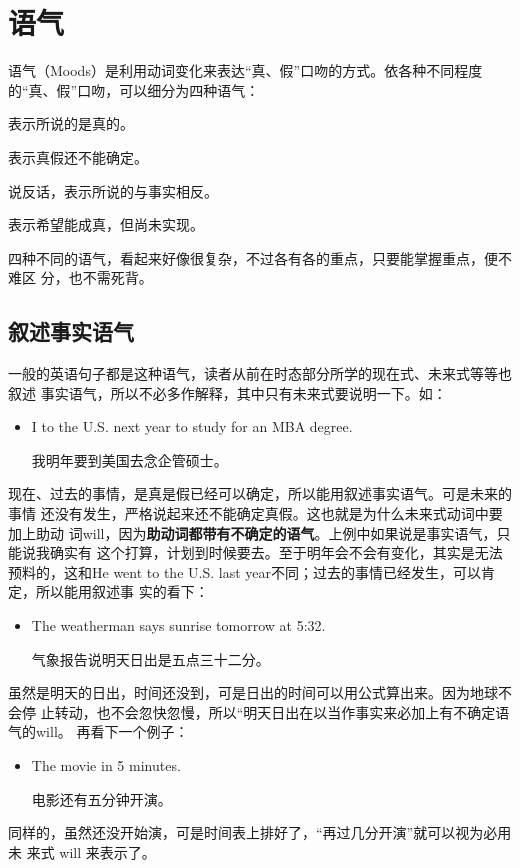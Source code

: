 \chapter{语气}

语气（Moods）是利用动词变化来表达“真、假”口吻的方式。依各种不同程度的“真、假”口吻，可以细分为四种语气：
\begin{description}[style=standard, leftmargin=2em]
\item [叙述事实语气 (Indicative)] 表示所说的是真的。
\item [条件语气 (Conditional)] 表示真假还不能确定。
\item [假设语气 (Subjunctive)] 说反话，表示所说的与事实相反。
\item [祈使语气 (Imperative)] 表示希望能成真，但尚未实现。
\end{description}

四种不同的语气，看起来好像很复杂，不过各有各的重点，只要能掌握重点，便不难区
分，也不需死背。

\section{叙述事实语气}

一般的英语句子都是这种语气，读者从前在时态部分所学的现在式、未来式等等也叙述
事实语气，所以不必多作解释，其中只有未来式要说明一下。如：
\begin{itemize}
\item  I  to the U.S. next year to study for an MBA degree.

  我明年要到美国去念企管硕士。
\end{itemize}
现在、过去的事情，是真是假已经可以确定，所以能用叙述事实语气。可是未来的事情
还没有发生，严格说起来还不能确定真假。这也就是为什么未来式动词中要加上助动
词will，因为\textbf{助动词都带有不确定的语气}。上例中如果说是事实语气，只能说我确实有
这个打算，计划到时候要去。至于明年会不会有变化，其实是无法预料的，这和He
went to the U.S. last year不同；过去的事情已经发生，可以肯定，所以能用叙述事
实的看下：
\begin{itemize}
\item  The weatherman says sunrise tomorrow  at 5:32.

  气象报告说明天日出是五点三十二分。
\end{itemize}
虽然是明天的日出，时间还没到，可是日出的时间可以用公式算出来。因为地球不会停
止转动，也不会忽快忽慢，所以“明天日出在以当作事实来必加上有不确定语气的will。
再看下一个例子：
\begin{itemize}
\item  The movie  in 5 minutes.

  电影还有五分钟开演。
\end{itemize}
同样的，虽然还没开始演，可是时间表上排好了，“再过几分开演”就可以视为必用未
来式 will 来表示了。

